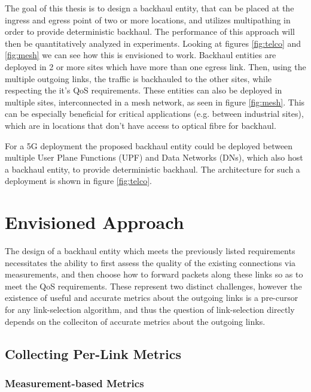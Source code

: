 The goal of this thesis is to design a backhaul entity, that can be placed at the ingress and egress point of two or more locations, and utilizes multipathing in order to provide deterministic backhaul. The performance of this approach will then be quantitatively analyzed in experiments. Looking at figures \ref{fig:telco} and \ref{fig:mesh} we can see how this is envisioned to work. Backhaul entities are deployed in 2 or more sites which have more than one egress link. Then, using the multiple outgoing links, the traffic is backhauled to the other sites, while respecting the it's QoS requirements. These entities can also be deployed in multiple sites, interconnected in a mesh network, as seen in figure \ref{fig:mesh}. This can be especially beneficial for critical applications (e.g. between industrial sites), which are in locations that don't have access to optical fibre for backhaul.

For a 5G deployment the proposed backhaul entity could be deployed between multiple User Plane Functions (UPF) and Data Networks (DNs), which also host a backhaul entity, to provide deterministic backhaul. The architecture for such a deployment is shown in figure \ref{fig:telco}.

\section{Envisioned Approach}

The design of a backhaul entity which meets the previously listed requirements necessitates the ability to first assess the quality of the existing connections via measurements, and then choose how to forward packets along these links so as to meet the QoS requirements. These represent two distinct challenges, however the existence of useful and accurate metrics about the outgoing links is a pre-cursor for any link-selection algorithm, and thus the question of link-selection directly depends on the colleciton of accurate metrics about the outgoing links.


\subsection{Collecting Per-Link Metrics}

\subsubsection{Measurement-based Metrics}

